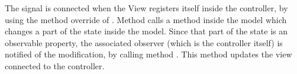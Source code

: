 The  signal is connected when the View registers
itself inside the controller, by using the method override of
.  Method 
calls a method inside the model which changes a part of the state
inside the model. Since that part of the state is an observable
property, the associated observer (which is the controller itself) is
notified of the modification, by calling method
. This method
updates the view connected to the controller.

